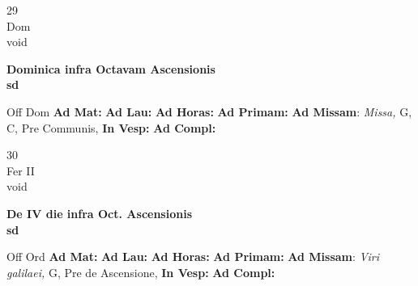 \documentclass[10pt, openany]{book}
\begin{document}
    \begin{center}
        \begin{minipage}{3.5in}
            \vspace{2em}
            \begin{minipage}{0.5in}
                {\Huge 29} \\
                {\normalsize Dom} \\
                {\normalsize void}
            \end{minipage}
            \begin{minipage}{3.0in}
                \textbf{ \large Dominica infra Octavam Ascensionis \\
                \textnormal{\normalsize sd}} \\ 
            \end{minipage}
            \begin{justify}Off Dom
                \textbf{Ad Mat: }
                \textbf{Ad Lau: }
                \textbf{Ad Horas: }
                \textbf{Ad Primam: }\textbf{Ad Missam}: \textit{Missa,} G, C, Pre Communis,  
                \textbf{In Vesp: }
                \textbf{Ad Compl: }
            \end{justify}
        \end{minipage}
    \end{center}

    \begin{center}
        \begin{minipage}{3.5in}
            \vspace{2em}
            \begin{minipage}{0.5in}
                {\Huge 30} \\
                {\normalsize Fer II} \\
                {\normalsize void}
            \end{minipage}
            \begin{minipage}{3.0in}
                \textbf{ \large De IV die infra Oct. Ascensionis \\
                \textnormal{\normalsize sd}} \\ 
            \end{minipage}
            \begin{justify}Off Ord
                \textbf{Ad Mat: }
                \textbf{Ad Lau: }
                \textbf{Ad Horas: }
                \textbf{Ad Primam: }\textbf{Ad Missam}: \textit{Viri galilaei,} G, Pre de Ascensione,  
                \textbf{In Vesp: }
                \textbf{Ad Compl: }
            \end{justify}
        \end{minipage}
    \end{center}
\end{document}
